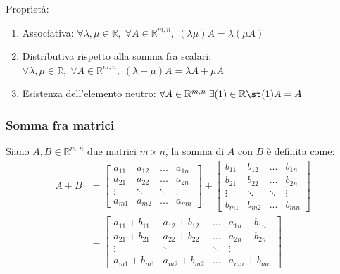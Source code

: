     \vspace{10pt}
    Proprietà:
    \begin{enumerate}[label=(\arabic*)]
        \item Associativa: $\forall \lambda, \mu \in \mathbb{R}, \; \forall A \in \mathbb{R}^{m, n}, \; (\lambda \mu) A = \lambda (\mu A)$
        \item Distributiva rispetto alla somma fra scalari: $\forall \lambda, \mu \in \mathbb{R}, \; \forall A \in \mathbb{R}^{m, n}, \; (\lambda + \mu)A = \lambda A + \mu A$
        \item Esistenza dell'elemento neutro: $\forall A \in \mathbb{R}^{m, n} \; \exists (1) \in \mathbb{R} \st (1)A = A$
    \end{enumerate}



\subsubsection{Somma fra matrici} \label{subsec:matsum}
    Siano $A, B \in \mathbb{R}^{m, n}$ due matrici $m \times n$, la somma di $A$ con $B$ è definita come:
    \[
        \begin{aligned}
        A + B
        &=
        \begin{bmatrix}
            a_{11} & a_{12} & ... & a_{1n} \\
            a_{21} & a_{22} & ... & a_{2n} \\
            \vdots & \ddots & \ddots & \vdots \\
            a_{m1} & a_{m2} & ... & a_{mn}
        \end{bmatrix}
        +
        \begin{bmatrix}
            b_{11} & b_{12} & ... & b_{1n} \\
            b_{21} & b_{22} & ... & b_{2n} \\
            \vdots & \ddots & \ddots & \vdots \\
            b_{m1} & b_{m2} & ... & b_{mn}
        \end{bmatrix}
        \\
        &=
        \begin{bmatrix}
            a_{11} + b_{11} & a_{12} + b_{12} & ... & a_{1n} + b_{1n} \\
            a_{21} + b_{21} & a_{22} + b_{22} & ... & a_{2n} + b_{2n} \\
            \vdots & \ddots & \ddots & \vdots \\
            a_{m1} + b_{m1} & a_{m2} + b_{m2} & ... & a_{mn} + b_{mn}
        \end{bmatrix}
        \end{aligned}
    \]

